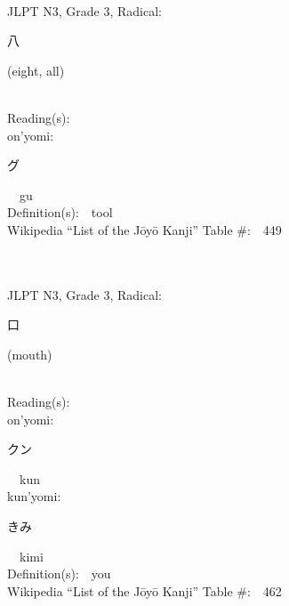 \begin{multicols}{2}
{\fontsize{34pt}{40pt}  }\ \ \\  %
{JLPT N3, Grade 3, Radical:\ \ {\begin{CJK}{UTF8}{min} 八 \end{CJK}} (eight, all) } \\
Reading(s):\ \ \\
{\hspace*{1em}}on'yomi:\ \ \\
{\hspace*{2em}}{\begin{CJK}{UTF8}{min} グ \end{CJK}}\ \ gu\ \ \\
Definition(s):\ \ tool \\
Wikipedia ``List of the J\=oy\=o Kanji'' Table \#:\ \ 449 \\
\ \ \\
{\fontsize{34pt}{40pt}  }\ \ \\  %
{JLPT N3, Grade 3, Radical:\ \ {\begin{CJK}{UTF8}{min} 口 \end{CJK}} (mouth) } \\
Reading(s):\ \ \\
{\hspace*{1em}}on'yomi:\ \ \\
{\hspace*{2em}}{\begin{CJK}{UTF8}{min} クン \end{CJK}}\ \ kun\ \ \\
{\hspace*{1em}}kun'yomi:\ \ \\
{\hspace*{2em}}{\begin{CJK}{UTF8}{min} きみ \end{CJK}}\ \ kimi\ \ \\
Definition(s):\ \ you \\
Wikipedia ``List of the J\=oy\=o Kanji'' Table \#:\ \ 462 \\
\ \ \\
{\fontsize{34pt}{40pt}  }\ \ \\  %

\end{multicols}
